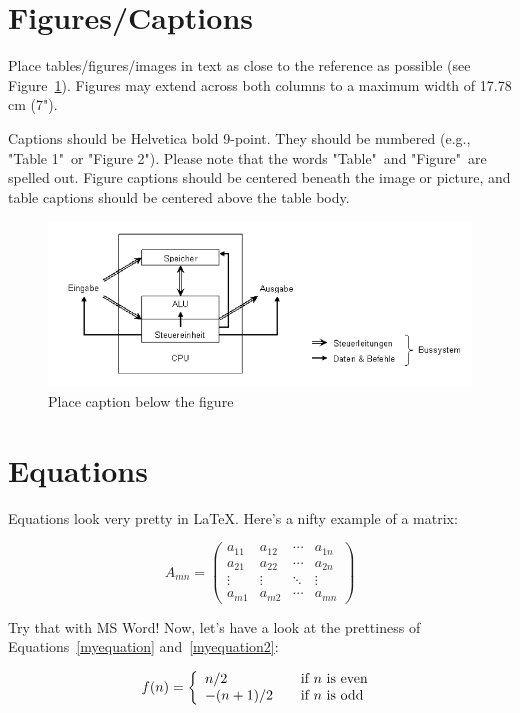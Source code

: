 	\section{Figures/Captions}
	Place tables/figures/images in text as close to the reference as possible
	(see Figure~\ref{myfigure}). Figures may extend across both columns to a
	maximum width of 17.78 cm (7").
	\par
	Captions should be Helvetica bold 9-point. They should be numbered (e.g.,
	"Table 1"\ or "Figure 2"). Please note that the words "Table"\ and "Figure"\
	are spelled out. Figure captions should be centered beneath the image or
	picture, and table captions should be centered above the table body.
	
	\begin{figure}[htbp]
		\includegraphics[width=\columnwidth]{images/beispiel.png}
		\caption{Place caption below the figure}
		\label{myfigure}
	\end{figure}
	
	\section{Equations}
	Equations look very pretty in \LaTeX. Here's a nifty example of a matrix:
	
	\begin{equation}
	 A_{mn} =
	 \begin{pmatrix}
	  a_{11} & a_{12} & \cdots & a_{1n} \\
	  a_{21} & a_{22} & \cdots & a_{2n} \\
	  \vdots  & \vdots  & \ddots & \vdots  \\
	  a_{m1} & a_{m2} & \cdots & a_{mn}
	 \end{pmatrix}
	\end{equation}
	
	Try that with MS Word! Now, let's have a look at the prettiness 
	of Equations~\ref{myequation} and~\ref{myequation2}:
	
	\begin{equation}
		f(n) = \left\{ 
			\begin{array}{l l}
			n/2 & \quad \text{if $n$ is even}\\
			-(n+1)/2 & \quad \text{if $n$ is odd}\\
		\end{array} \right.
		\label{myequation}
	\end{equation}
	
